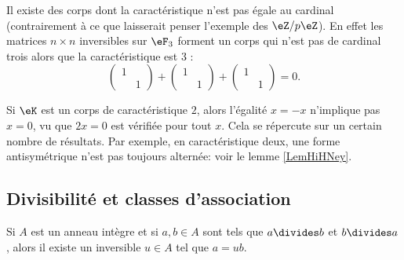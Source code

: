 \begin{example}
    Il existe des corps dont la caractéristique n'est pas égale au cardinal (contrairement à ce que laisserait penser l'exemple des \( \eZ/p\eZ\)). En effet les matrices \( n\times n\) inversibles sur \( \eF_{3}\) forment un corps qui n'est pas de cardinal trois alors que la caractéristique est \( 3\) :
    \begin{equation}
        \begin{pmatrix}
            1    &       \\ 
                &   1    
            \end{pmatrix}+\begin{pmatrix}
                1    &       \\ 
                    &   1    
                \end{pmatrix}+\begin{pmatrix}
                    1    &       \\ 
                        &   1    
                \end{pmatrix}=0.
    \end{equation}
\end{example}

\begin{example}
    Si \( \eK\) est un corps de caractéristique \( 2\), alors l'égalité \( x=-x\) n'implique pas \( x=0\), vu que \( 2x=0\) est vérifiée pour tout \( x\). Cela se répercute sur un certain nombre de résultats. Par exemple, en caractéristique deux, une forme antisymétrique n'est pas toujours alternée: voir le lemme \ref{LemHiHNey}.
\end{example}

\subsection{Divisibilité et classes d'association}  
\label{DivisibiliteAnneauxIntegres}

\begin{lemma}\label{LemRmVTRq}
    Si \( A\) est un anneau intègre et si \( a,b\in A\) sont tels que \( a\divides b\) et \( b\divides a\), alors il existe un inversible \( u\in A\) tel que \( a=ub\).
\end{lemma}

